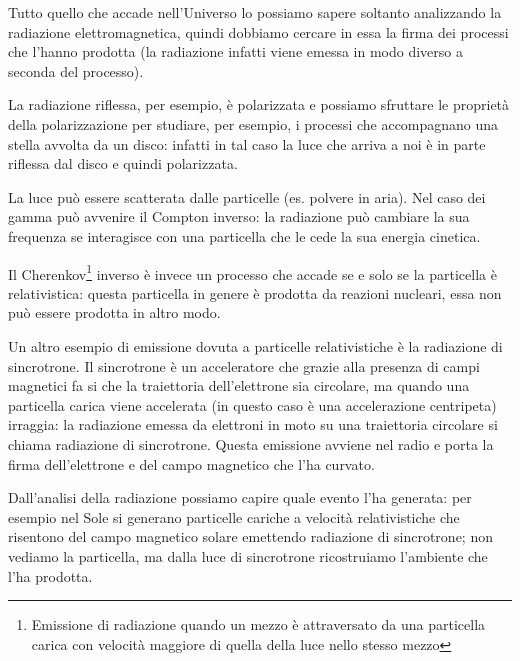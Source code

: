 Tutto quello che accade nell'Universo lo possiamo sapere soltanto analizzando la radiazione elettromagnetica, quindi dobbiamo cercare in essa la firma dei processi che l'hanno prodotta (la radiazione infatti viene emessa in modo diverso a seconda del processo).

La radiazione riflessa, per esempio, è polarizzata e possiamo sfruttare le proprietà della polarizzazione per studiare, per esempio, i processi che accompagnano una stella avvolta da un disco: infatti in tal caso la luce che arriva a noi è in parte riflessa dal disco e quindi polarizzata.

La luce può essere scatterata dalle particelle (es. polvere in aria). Nel caso dei gamma può avvenire il Compton inverso: la radiazione può cambiare la sua frequenza se interagisce con una particella che le cede la sua energia cinetica.

Il Cherenkov\footnote{Emissione di radiazione quando un mezzo è attraversato da una particella carica con velocità maggiore di quella della luce nello stesso mezzo} inverso è invece un processo che accade se e solo se la particella è relativistica: questa particella in genere è prodotta da reazioni nucleari, essa non può essere prodotta in altro modo.

Un altro esempio di emissione dovuta a particelle relativistiche è la radiazione di sincrotrone. Il sincrotrone è un acceleratore che grazie alla presenza di campi magnetici fa si che la traiettoria dell'elettrone sia circolare, ma quando una particella carica viene accelerata (in questo caso è una accelerazione centripeta) irraggia: la radiazione emessa da elettroni in moto su una traiettoria circolare si chiama radiazione di sincrotrone. Questa emissione avviene nel radio e porta la firma dell'elettrone e del campo magnetico che l'ha curvato.

Dall'analisi della radiazione possiamo capire quale evento l'ha generata: per esempio nel Sole si generano particelle cariche a velocità relativistiche che risentono del campo magnetico solare emettendo radiazione di sincrotrone; non vediamo la particella, ma dalla luce di sincrotrone ricostruiamo l'ambiente che l'ha prodotta.

